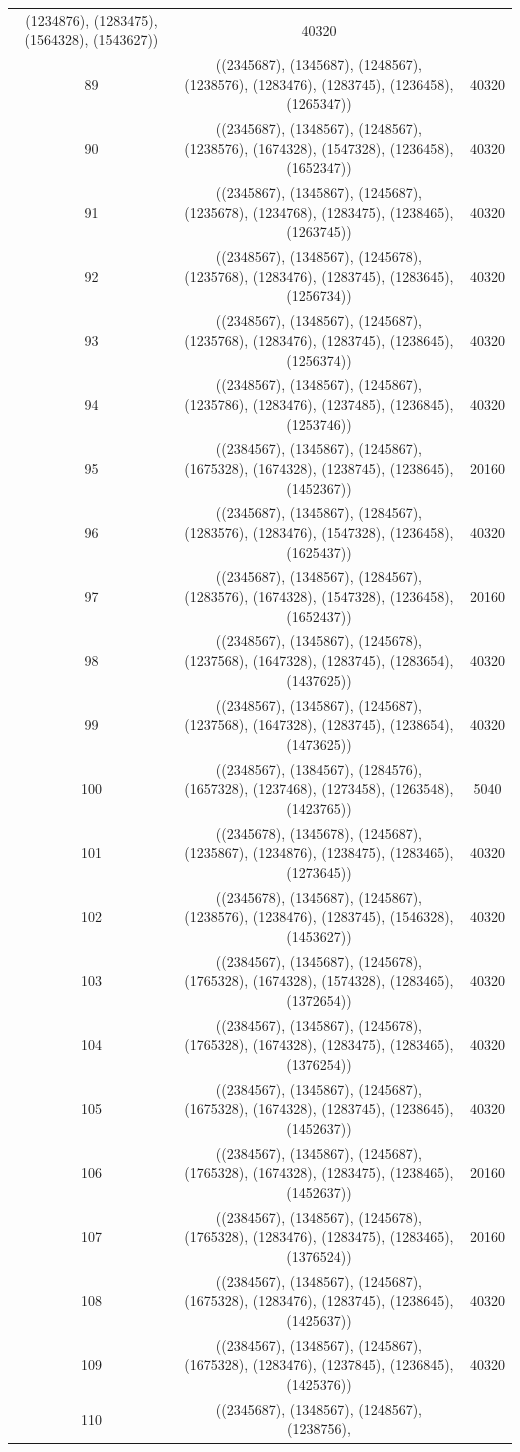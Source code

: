 \documentclass[pdftex]{sigma}
\theoremstyle{definition}
\numberwithin{equation}{section}
\begin{document}
\begin{center}
\begin{longtable}{|@{\,}c@{\,}|@{\,}c@{\,}|@{\,}c@{\,}|}
(1234876), (1283475), (1564328), (1543627)) & 40320 \\ 89 & ((2345687), (1345687), (1248567), (1238576), (1283476), (1283745), (1236458), (1265347)) & 40320 \\ 90 & ((2345687), (1348567), (1248567), (1238576), (1674328), (1547328), (1236458), (1652347)) & 40320 \\ 91 & ((2345867), (1345867), (1245687), (1235678), (1234768), (1283475), (1238465), (1263745)) & 40320 \\ 92 & ((2348567), (1348567), (1245678), (1235768), (1283476), (1283745), (1283645), (1256734)) & 40320 \\ 93 & ((2348567), (1348567), (1245687), (1235768), (1283476), (1283745), (1238645), (1256374)) & 40320 \\ 94 & ((2348567), (1348567), (1245867), (1235786), (1283476), (1237485), (1236845), (1253746)) & 40320 \\ 95 & ((2384567), (1345867), (1245867), (1675328), (1674328), (1238745), (1238645), (1452367)) & 20160 \\ 96 & ((2345687), (1345867), (1284567), (1283576), (1283476), (1547328), (1236458), (1625437)) & 40320 \\ 97 & ((2345687), (1348567), (1284567), (1283576), (1674328), (1547328), (1236458), (1652437)) & 20160 \\ 98 & ((2348567), (1345867), (1245678), (1237568), (1647328), (1283745), (1283654), (1437625)) & 40320 \\ 99 & ((2348567), (1345867), (1245687), (1237568), (1647328), (1283745), (1238654), (1473625)) & 40320 \\ 100 & ((2348567), (1384567), (1284576), (1657328), (1237468), (1273458), (1263548), (1423765)) & 5040 \\ 101 & ((2345678), (1345678), (1245687), (1235867), (1234876), (1238475), (1283465), (1273645)) & 40320 \\ 102 & ((2345678), (1345687), (1245867), (1238576), (1238476), (1283745), (1546328), (1453627)) & 40320 \\ 103 & ((2384567), (1345687), (1245678), (1765328), (1674328), (1574328), (1283465), (1372654)) & 40320 \\ 104 & ((2384567), (1345867), (1245678), (1765328), (1674328), (1283475), (1283465), (1376254)) & 40320 \\ 105 & ((2384567), (1345867), (1245687), (1675328), (1674328), (1283745), (1238645), (1452637)) & 40320 \\ 106 & ((2384567), (1345867), (1245687), (1765328), (1674328), (1283475), (1238465), (1452637)) & 20160 \\ 107 & ((2384567), (1348567), (1245678), (1765328), (1283476), (1283475), (1283465), (1376524)) & 20160 \\ 108 & ((2384567), (1348567), (1245687), (1675328), (1283476), (1283745), (1238645), (1425637)) & 40320 \\ 109 & ((2384567), (1348567), (1245867), (1675328), (1283476), (1237845), (1236845), (1425376)) & 40320 \\ 110 & ((2345687), (1348567), (1248567), (1238756), 
\end{longtable}
\end{center}
\end{document}
